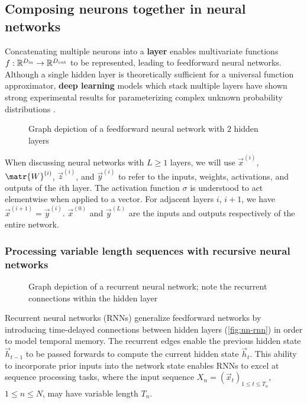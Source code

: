\subsection{Composing neurons together in neural networks}

Concatenating multiple neurons into a \textbf{layer} enables multivariate functions $f :
\mathbb{R}^{D_\text{in}} \to \mathbb{R}^{D_\text{out}}$ to be represented, leading to feedforward
neural networks. Although a single hidden layer is theoretically sufficient for
a universal function approximator\cite{Cybenko1993}, \textbf{deep learning}
models which stack multiple layers have shown strong experimental results
for parameterizing complex unknown probability distributions \cite{Bengio2011}.

\begin{figure}[htpb]
    \centering
    
    \caption{Graph depiction of a feedforward neural network with $2$ hidden layers}
    \label{fig:nn-ffw}
\end{figure}

When discussing neural networks with $L \geq 1$ layers, we will use
$\vec{x}^{(i)}$, $\matr{W}^{(i)}$, $\vec{z}^{(i)}$, and $\vec{y}^{(i)}$ to
refer to the inputs, weights, activations, and outputs of the $i$th layer. The
activation function $\sigma$ is understood to act elementwise when applied to a
vector. For adjacent layers $i$, $i+1$, we have $\vec{x}^{(i+1)} =
\vec{y}^{(i)}$. $\vec{x}^{(0)}$ and $\vec{y}^{(L)}$ are the inputs and outputs
respectively of the entire network.

\subsubsection{Processing variable length sequences with recursive neural networks}

\begin{figure}[htpb]
    \centering
    
    \caption{Graph depiction of a recurrent neural network; note the recurrent connections
    within the hidden layer}
    \label{fig:nn-rnn}
\end{figure}

Recurrent neural networks (RNNs) generalize feedforward networks by introducing
time-delayed connections between hidden layers (\autoref{fig:nn-rnn}) in order
to model temporal memory. The recurrent edges enable the previous hidden state
$\vec{h}_{t-1}$ to be passed forwards to compute the current hidden state
$\vec{h}_t$. This ability to incorporate prior inputs into the network state
enables RNNs to excel at sequence processing tasks, where the input sequence
$X_n = (\vec{x}_t)_{1 \leq t \leq T_n}$, $1 \leq n \leq N$, may have variable
length $T_n$.

